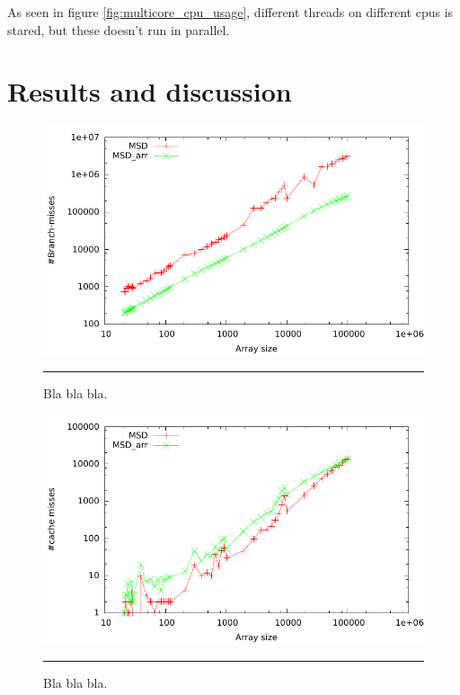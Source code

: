 As seen in figure \ref{fig:multicore_cpu_usage}, different threads on different cpus is stared, but these doesn't run in parallel.

\section{Results and discussion}


\begin{figure}[htbp]
	\centering
		\includegraphics[width=\textwidth]{./Figures/Project2b/Branch_misses.pdf}
		\rule{35em}{0.5pt}
	\caption[Branch misses]{
	Bla bla bla.
	}
	\label{fig:Branch_misses_p2b}
\end{figure}


\begin{figure}[htbp]
	\centering
		\includegraphics[width=\textwidth]{./Figures/Project2b/Cache_misses.pdf}
		\rule{35em}{0.5pt}
	\caption[Cache misses]{
	Bla bla bla.
	}
	\label{fig:Cache_misses_p2b}
\end{figure}



